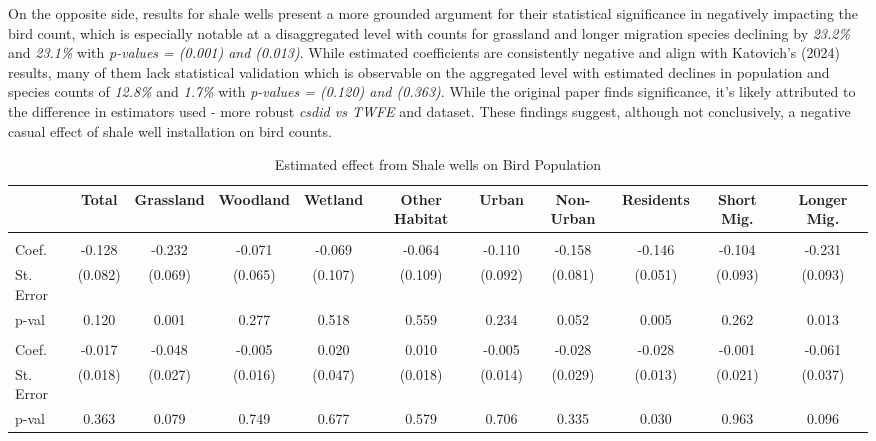 \documentclass{article}
\begin{document}
\addlinespace

On the opposite side, results for shale wells present a more grounded argument for their statistical significance in negatively impacting the bird count, which is especially notable at a disaggregated level with counts for grassland and longer migration species declining by \textit{23.2\%} and \textit{23.1\%} with \textit{p-values = (0.001) and (0.013)}. While estimated coefficients are consistently negative and align with Katovich's (2024) results, many of them lack statistical validation which is observable on the aggregated level with estimated declines in population and species counts of \textit{12.8\%} and \textit{1.7\%} with \textit{p-values = (0.120) and (0.363)}. While the original paper finds significance, it's likely attributed to the difference in estimators used - more robust \textit{csdid vs TWFE} and dataset. These findings suggest, although not conclusively, a negative casual effect of shale well installation on bird counts.

\begin{table}[!ht]
\centering
\caption{Estimated effect from Shale wells on Bird Population}
\begin{adjustbox}{width=\textwidth}
\begin{tabular}{@{}lcccccccccc@{}}
\toprule
 & Total & Grassland & Woodland & Wetland & Other Habitat & Urban & Non-Urban & Residents & Short Mig. & Longer Mig. \\
\midrule
\addlinespace
\multicolumn{11}{l}{\hspace{-0.5em}\textbf{Total count}} \\
Coef. & -0.128 & -0.232 & -0.071 & -0.069 & -0.064 & -0.110 & -0.158 & -0.146 & -0.104 & -0.231 \\
St. Error & (0.082) & (0.069) & (0.065) & (0.107) & (0.109) & (0.092) & (0.081) & (0.051) & (0.093) & (0.093) \\
p-val & 0.120 & 0.001 & 0.277 & 0.518 & 0.559 & 0.234 & 0.052 & 0.005 & 0.262 & 0.013 \\
\addlinespace
\multicolumn{11}{l}{\hspace{-0.5em}\textbf{Total species}} \\
Coef. & -0.017 & -0.048 & -0.005 & 0.020 & 0.010 & -0.005 & -0.028 & -0.028 & -0.001 & -0.061 \\
St. Error & (0.018) & (0.027) & (0.016) & (0.047) & (0.018) & (0.014) & (0.029) & (0.013) & (0.021) & (0.037) \\
p-val & 0.363 & 0.079 & 0.749 & 0.677 & 0.579 & 0.706 & 0.335 & 0.030 & 0.963 & 0.096 \\
\bottomrule
\end{tabular}
\end{adjustbox}
\end{table}
\end{document}
